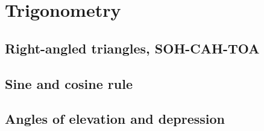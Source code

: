 
\section{Trigonometry}

\subsection{Right-angled triangles, SOH-CAH-TOA}


\subsection{Sine and cosine rule}


\subsection{Angles of elevation and depression}

